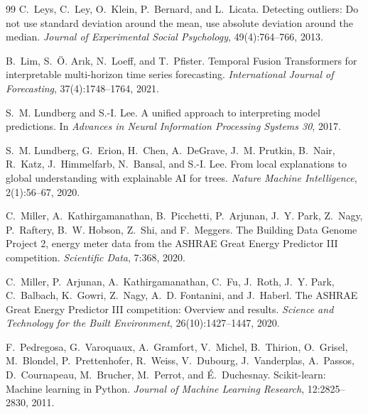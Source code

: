 \documentclass[11pt,a4paper]{article}
\begin{document}
\begin{thebibliography}{99}
C.~Leys, C.~Ley, O.~Klein, P.~Bernard, and L.~Licata.
\newblock Detecting outliers: Do not use standard deviation around the mean, use absolute deviation around the
median.
\newblock \emph{Journal of Experimental Social Psychology}, 49(4):764--766, 2013.

B.~Lim, S.~{\"O}. Ar{\i}k, N.~Loeff, and T.~Pfister.
\newblock Temporal Fusion Transformers for interpretable multi-horizon time series forecasting.
\newblock \emph{International Journal of Forecasting}, 37(4):1748--1764, 2021.

S.~M. Lundberg and S.-I. Lee.
\newblock A unified approach to interpreting model predictions.
\newblock In \emph{Advances in Neural Information Processing Systems 30}, 2017.

S.~M. Lundberg, G.~Erion, H.~Chen, A.~DeGrave, J.~M. Prutkin, B.~Nair, R.~Katz, J.~Himmelfarb, N.~Bansal, and
S.-I. Lee.
\newblock From local explanations to global understanding with explainable AI for trees.
\newblock \emph{Nature Machine Intelligence}, 2(1):56--67, 2020.

C.~Miller, A.~Kathirgamanathan, B.~Picchetti, P.~Arjunan, J.~Y. Park, Z.~Nagy, P.~Raftery, B.~W. Hobson, Z.~Shi, and
F.~Meggers.
\newblock The Building Data Genome Project 2, energy meter data from the ASHRAE Great Energy Predictor III
competition.
\newblock \emph{Scientific Data}, 7:368, 2020.

C.~Miller, P.~Arjunan, A.~Kathirgamanathan, C.~Fu, J.~Roth, J.~Y. Park, C.~Balbach, K.~Gowri, Z.~Nagy, A.~D.
Fontanini, and J.~Haberl.
\newblock The ASHRAE Great Energy Predictor III competition: Overview and results.
\newblock \emph{Science and Technology for the Built Environment}, 26(10):1427--1447, 2020.

F.~Pedregosa, G.~Varoquaux, A.~Gramfort, V.~Michel, B.~Thirion, O.~Grisel, M.~Blondel, P.~Prettenhofer, R.~Weiss,
V.~Dubourg, J.~Vanderplas, A.~Passos, D.~Cournapeau, M.~Brucher, M.~Perrot, and {\'E}.~Duchesnay.
\newblock Scikit-learn: Machine learning in Python.
\newblock \emph{Journal of Machine Learning Research}, 12:2825--2830, 2011.

\end{thebibliography}
\end{document}

